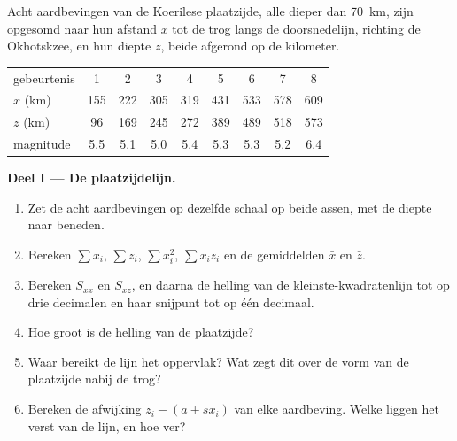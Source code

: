 \begin{problem}
\label{pb:b1:active-margins:1}
Acht aardbevingen van de Koerilese plaatzijde, alle dieper dan \qty{70}{km}, zijn opgesomd naar hun afstand $x$ tot de trog langs de doorsnedelijn, richting de Okhotskzee, en hun diepte $z$, beide afgerond op de kilometer.

\begin{center}
\small
\begin{tabular}{lcccccccc}
\hline
gebeurtenis & 1 & 2 & 3 & 4 & 5 & 6 & 7 & 8\\
$x$ (\unit{km}) & 155 & 222 & 305 & 319 & 431 & 533 & 578 & 609\\
$z$ (\unit{km}) & 96 & 169 & 245 & 272 & 389 & 489 & 518 & 573\\
magnitude & 5.5 & 5.1 & 5.0 & 5.4 & 5.3 & 5.3 & 5.2 & 6.4\\
\hline
\end{tabular}
\end{center}

\medskip
\noindent\textbf{Deel I --- De plaatzijdelijn.}
\begin{enumerate}
  \item Zet de acht aardbevingen op dezelfde schaal op beide assen, met de diepte naar beneden.
  \item Bereken $\sum x_i$, $\sum z_i$, $\sum x_i^2$, $\sum x_i z_i$ en de gemiddelden $\bar x$ en $\bar z$.
  \item Bereken $S_{xx}$ en $S_{xz}$, en daarna de helling van de kleinste-kwadratenlijn tot op drie decimalen en haar snijpunt tot op één decimaal.
  \item Hoe groot is de helling van de plaatzijde?
  \item Waar bereikt de lijn het oppervlak? Wat zegt dit over de vorm van de plaatzijde nabij de trog?
  \item Bereken de afwijking $z_i - (a + s x_i)$ van elke aardbeving. Welke liggen het verst van de lijn, en hoe ver?
\end{enumerate}


\end{problem}

